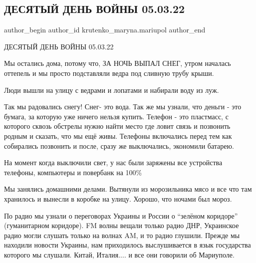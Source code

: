 
 
 
 
 

\subsection{ДЕСЯТЫЙ ДЕНЬ ВОЙНЫ 05.03.22}
\label{sec:05_03_2023.fb.krutenko_maryna.mariupol.1.desjatyj_den_05_03}

\ifcmt
 author_begin
   author_id krutenko_maryna.mariupol
 author_end
\fi

ДЕСЯТЫЙ ДЕНЬ ВОЙНЫ 05.03.22

Мы остались дома, потому что, ЗА НОЧЬ ВЫПАЛ СНЕГ, утром началась оттепель и мы
просто подставляли ведра под сливную трубу крыши. 

Люди вышли на улицу с ведрами и лопатами и набирали воду из луж. 

Так мы радовались снегу! Снег- это вода. Так же мы узнали, что деньги - это
бумага, за которую уже ничего нельзя купить. Телефон - это пластмасс, с
которого сквозь обстрелы нужно найти место где ловит связь и позвонить родным и
сказать, что мы ещё живы. Телефоны включались перед тем как собирались
позвонить и после, сразу же выключались, экономили батарею. 

На момент когда выключили свет, у нас были заряжены все устройства телефоны,
компьютеры и повербанк на 100\% 

Мы занялись домашними делами. Вытянули из морозильника мясо и все что там
хранилось и вынесли в коробке на улицу. Хорошо, что ночами был мороз.

По радио мы узнали о переговорах Украины и России о \enquote{зелёном коридоре}
(гуманитарном коридоре). FM волны вещали только радио ДНР, Украинское радио
могли слушать только на волнах AM, и то радио глушили. Прежде мы находили
новости Украины, нам приходилось выслушивается в язык государства которого мы
слушали. Китай, Италия.... и все они говорили об Мариуполе.

